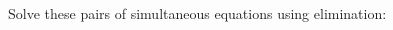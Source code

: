 \question Solve these pairs of simultaneous equations using elimination:\hs
\begin{multicols}{2}\ms %
\end{multicols}